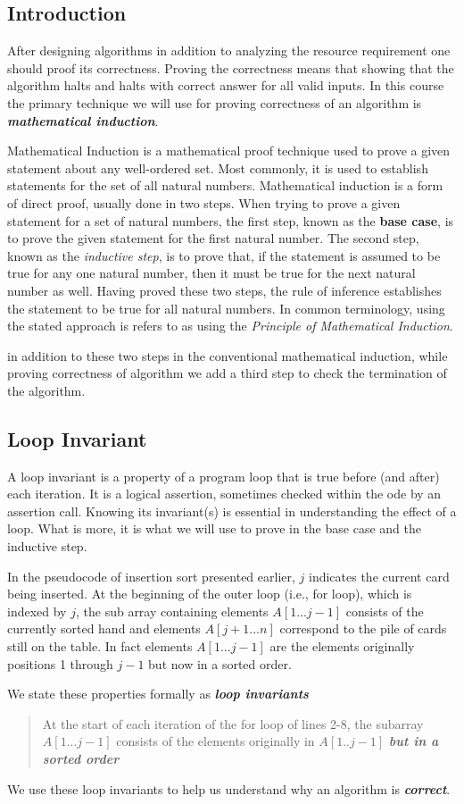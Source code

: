 \documentclass[12pt,a4paper]{book}
\begin{document}
\subsection{Introduction}
After designing algorithms in addition to analyzing the resource requirement one should proof its correctness. Proving the correctness means that showing that the algorithm halts and halts with correct answer for all valid inputs. In this course the primary technique we will use for proving correctness of an algorithm is \textbf{\textit{mathematical induction}}.
\par Mathematical Induction is a mathematical proof technique used to prove a given statement about any well-ordered set. Most commonly, it is used to establish statements for the set of all natural numbers. Mathematical induction is a form of direct proof, usually done in two steps. When trying to prove a given statement for a set of natural numbers, the first step, known as the \textbf{base case}, is to prove the given statement for the first natural number. The second step, known as the \textit{inductive step}, is to prove that, if the statement is assumed to be true for any one natural number, then it must be true for the next natural number as well. Having proved these two steps, the rule of inference establishes the statement to be true for all natural numbers. In common terminology, using the stated approach is refers to as using the \textit{Principle of Mathematical Induction}.
\par in addition to these two steps in the conventional mathematical induction, while proving correctness of algorithm we add a third step to check the termination of the algorithm. 
\subsection{Loop Invariant}
A loop invariant is a property of a program loop that is true before (and after) each iteration. It is a logical assertion, sometimes checked within the ode by an assertion call. Knowing its invariant(s) is essential in understanding the effect of a loop. What is more, it is what we will use to prove in the base case and the inductive step. 
\par In the pseudocode of insertion sort presented earlier, $j$ indicates the current card being inserted. At the beginning of the outer loop (i.e., for loop), which is indexed by $j$, the sub array containing elements $A[1... j-1]$ consists of the currently sorted hand and elements $A[j+1 ...n]$ correspond to the pile of cards still on the table. In fact elements $A[1... j-1]$ are the elements originally positions 1 through $j-1$ but now in a sorted order.
\par We state these properties formally as \textit{\textbf{loop invariants}}
\begin{quotation}
At the start of each iteration of the for loop of lines 2-8, the subarray $A[1... j-1]$ consists of the elements originally in $A[1 .. j-1]$ \textbf{\textit{but in a sorted order}}
\end{quotation}
We use these loop invariants to help us understand why an algorithm is \textbf{\textit{correct}}.
\end{document}

